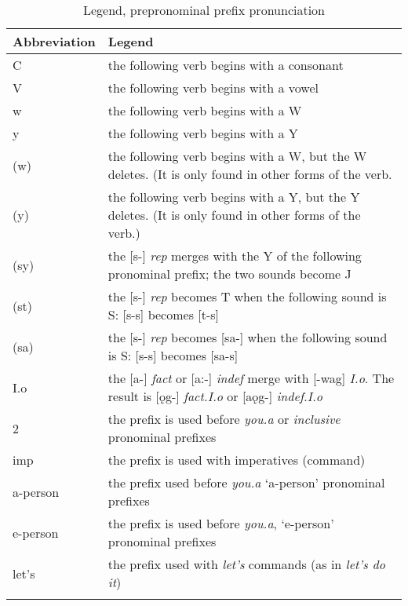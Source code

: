 

\begin{table}
\caption{Legend, prepronominal prefix pronunciation}
\label{tab:1:ppplegend}
\begin{tabularx}{\textwidth}{lQ}
\lsptoprule
Abbreviation & Legend\\
\midrule
C & the following verb begins with a consonant\\
V & the following verb begins with a vowel\\
w & the following verb begins with a W\\
y &  the following verb begins with a Y \\
(w) & the following verb begins with a W, but the W deletes. (It is only found in other forms of the verb.  \\
(y) &  the following verb begins with a Y, but the Y deletes. (It is only found in other forms of the verb.)\\
(sy) & the [s-] \textit{rep} merges with the Y of the following pronominal prefix; the two sounds become J\\
(st) & the [s-] \textit{rep} becomes T when the following sound is S: [s-s] becomes [t-s]\\
(sa) & the [s-] \textit{rep} becomes [sa-] when the following sound is S: [s-s] becomes [sa-s]\\
I.o & the [a-] \textit{fact} or [a:-] \textit{indef} merge with [-wag] \textit{I.o}. The result is [ǫg-] \textit{fact.I.o} or [aǫg-] \textit{indef.I.o}\\
2 & the prefix is used before \textit{you.a} or \textit{inclusive} pronominal prefixes\\
imp & the prefix is used with imperatives (command)\\
a-person & the prefix used before \textit{you.a} ‘a-person’ pronominal prefixes\\
e-person & the prefix is used before \textit{you.a}, ‘e-person’ pronominal prefixes\\
let’s & the prefix used with \textit{let’s} commands (as in \textit{let’s do it})\\
\lspbottomrule
\end{tabularx}
\end{table}



